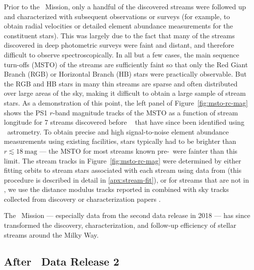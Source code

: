 \documentclass[final,5p,times,twocolumn,authoryear]{elsarticle}
\begin{document}
Prior to the \gaia\ Mission, only a handful of the discovered streams were followed up
and characterized with subsequent observations or surveys (for example, to obtain radial
velocities or detailed element abundance measurements for the constituent stars).
This was largely due to the fact that many of the streams discovered in deep photometric
surveys were faint and distant, and therefore difficult to observe spectroscopically.
In all but a few cases, the main sequence turn-offs (MSTO) of the streams are
sufficiently faint so that only the Red Giant Branch (RGB) or Horizontal Branch (HB)
stars were practically observable.
But the RGB and HB stars in many thin streams are sparse and often distributed over
large areas of the sky, making it difficult to obtain a large sample of stream stars.
As a demonstration of this point, the left panel of Figure~\ref{fig:msto-rc-mag} shows
the PS1 $r$-band magnitude tracks of the MSTO as a function of stream longitude for 7
streams discovered before \gaia\  that have since been identified using \gaia\
astrometry. To obtain precise and high signal-to-noise element abundance measurements
using existing facilities, stars typically had to be brighter than $r \lesssim
18~\textrm{mag}$ --- the MSTO for most streams known pre-\gaia\ were fainter than this
limit.
The stream tracks in Figure~\ref{fig:msto-rc-mag} were determined by either fitting
orbits to stream stars associated with each stream using data from \citet{ibata:2023}
(this procedure is described in detail in \ref{apx:stream-fit}), or for streams that are
not in \citet{ibata:2023}, we use the distance modulus tracks reported in
\citet{li:2022} combined with sky tracks collected from discovery or characterization
papers \citep{shipp:2018, fu:2018, shipp:2019, ferguson:2022, tavangar:2022}.

The \gaia\ Mission --- especially data from the second data release in 2018 --- has
since transformed the discovery, characterization, and follow-up efficiency of stellar
streams around the Milky Way.


\subsection{After \gaia\ Data Release 2}
\end{document}
